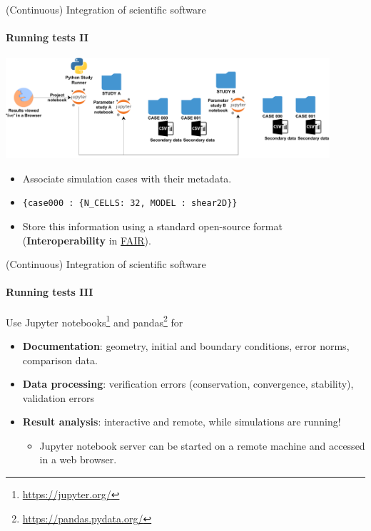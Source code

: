 \begin{frame}{(Continuous) Integration of scientific software} 
\framesubtitle{Running tests II}
\vfill

\begin{center}
    \includegraphics[width=0.9\textwidth]{figures/Cluster-Parameter-Study-Organization.pdf}
\end{center}

    \begin{itemize}
        \item Associate simulation cases with their metadata. 
        \item \texttt{\{case000 : \{N\_CELLS: 32, MODEL : shear2D\}\}}
        \item Store this information using a standard open-source format (\textbf{Interoperability} in \href{https://www.go-fair.org/fair-principles/}{FAIR}).
    \end{itemize}

\end{frame}

\begin{frame}{(Continuous) Integration of scientific software} 
\framesubtitle{Running tests III}
\vfill

    Use Jupyter notebooks\footnote{\href{https://jupyter.org/}{https://jupyter.org/}} and pandas\footnote{\href{https://pandas.pydata.org/}{https://pandas.pydata.org/}} for 
    \begin{itemize}
        \item \textbf{Documentation}: geometry, initial and boundary conditions, error norms, comparison data.
        \item \textbf{Data processing}: verification errors (conservation, convergence, stability), validation errors 
        \item \textbf{Result analysis}: interactive and remote, while simulations are running!
            \begin{itemize}
                \item Jupyter notebook server can be started on a remote machine and accessed in a web browser.
            \end{itemize}
    \end{itemize}


\end{frame}

